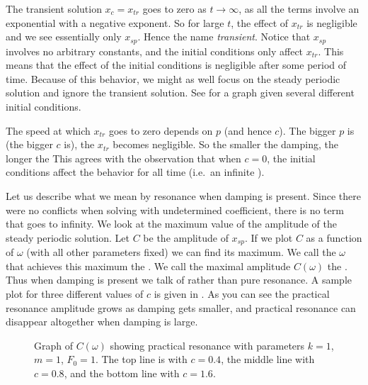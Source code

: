 \documentclass[12pt]{book}
\begin{document}
The transient solution $x_c = x_{tr}$ goes to zero as $t \to \infty$,
as all the terms involve an exponential with a negative exponent.  So
for large $t$, the effect of $x_{tr}$ is negligible and we see essentially
only $x_{sp}$.
Hence the name \emph{transient}.
Notice that $x_{sp}$ involves no arbitrary constants, and
the initial conditions only affect $x_{tr}$.  This means that the effect
of the initial conditions is negligible after some period of time.
Because of this behavior,
we might as well focus on the
steady periodic solution and ignore the transient solution.  See
 for a graph given several different initial conditions.

The speed at which $x_{tr}$ goes to zero depends on $p$ (and
hence $c$).  The
bigger $p$ is (the bigger $c$ is), the  $x_{tr}$ becomes negligible. 
So the smaller the damping, the longer the   This agrees
with the observation that when $c=0$, the initial conditions affect the
behavior for all time (i.e.\ an infinite ).

\medskip

Let us describe what we mean by resonance when damping is present.
Since there were no conflicts when solving with undetermined coefficient,
there is no term that goes to infinity.  We look at the
maximum value of the amplitude of the steady periodic solution.
Let $C$ be the amplitude of $x_{sp}$.
If we plot $C$ as a function of $\omega$ (with all other
parameters fixed) we can find its maximum.
We call the $\omega$ that achieves this maximum
the \emph{}.
We call the maximal amplitude $C(\omega)$
the \emph{}.
Thus when damping is present we talk of \emph{}
rather than pure resonance.
A sample plot for three different
values of $c$ is given in .  As you can see the
practical resonance amplitude grows as damping gets smaller, and 
practical resonance can disappear altogether when damping is large.

\begin{figure}[h!t]
\capstart
\begin{center}
\caption{Graph of $C(\omega)$ showing practical resonance with parameters
$k=1$, $m=1$, $F_0 = 1$. The top line is with $c=0.4$, the middle line with
$c=0.8$, and the bottom line with
$c=1.6$.\label{3.6:pracresfig}}
\end{center}
\end{figure}
\end{document}
